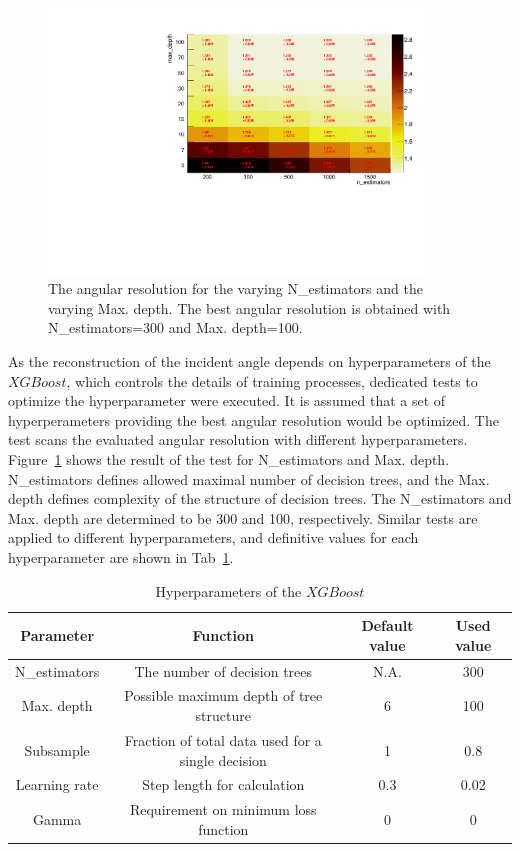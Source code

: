 \documentclass[jkps,preprint,fleqn,showpacs,showkeys]{revtex4}
\newcommand{\XGB}{XGBoost}
\begin{document}
\begin{figure}[!hbt]
\includegraphics[width=0.89\textwidth]{figures/optimization_plot.pdf}
\caption{The angular resolution for the varying N\_estimators and the varying Max. depth. The best angular resolution is obtained with N\_estimators=300 and Max. depth=100.  }
\label{fig:par_scan}
\end{figure}

As the reconstruction of the incident angle depends on hyperparameters of the $\XGB$, which controls the details of training processes, dedicated tests to optimize the hyperparameter were executed. It is assumed that a set of hyperperameters providing the best angular resolution would be optimized. The test scans the evaluated angular resolution with different hyperparameters. Figure~\ref{fig:par_scan} shows the result of the test for N\_estimators and Max. depth. N\_estimators defines allowed maximal number of decision trees, and the Max. depth defines complexity of the structure of decision trees. The N\_estimators and Max. depth are determined to be 300 and 100, respectively. Similar tests are applied to different hyperparameters, and definitive values for each hyperparameter are shown in Tab~\ref{tab:XgbPar}.
 
\begin{table}[hbt!]
\centering
\caption{Hyperparameters of the $\XGB$}
\begin{tabular}{cccc}
\hline 
Parameter & Function & Default value & Used value \\ \hline 
N\_estimators & The number of decision trees & N.A. & 300 \\  
Max. depth & Possible maximum depth of tree structure & 6 & 100 \\ 
Subsample & Fraction of total data used for a single decision & 1 & 0.8 \\ 
Learning rate & Step length for calculation & 0.3 & 0.02 \\ 
Gamma & Requirement on minimum loss function & 0 & 0 \\ 
\hline
\end{tabular}
\label{tab:XgbPar}
\end{table}
\end{document}
